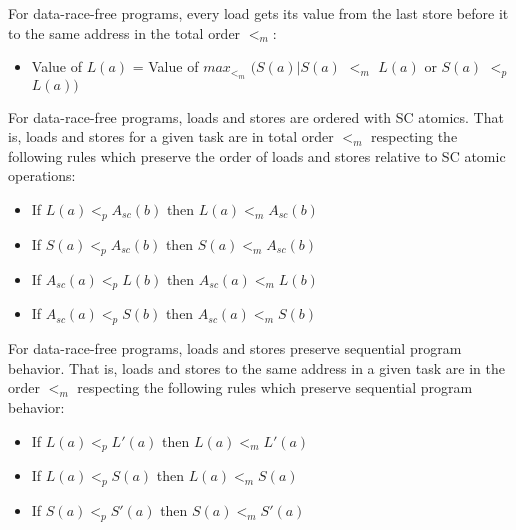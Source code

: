 For data-race-free programs, every load gets its value from the last
store before it to the same address in the total order $<_m$:
\begin{itemize}
  \item Value of $L(a)$ = Value of $max_{<_m}$ $( S(a)|S(a)$ $<_m$ $L(a)$ or $S(a)$ $<_p$ $L(a) )$
\end{itemize}

For data-race-free programs, loads and stores are ordered with SC
atomics.  That is, loads and stores for a given task are in total
order $<_m$ respecting the following rules which preserve the order of
loads and stores relative to SC atomic operations:


\begin{itemize}
  \item If $L(a)<_pA_{sc}(b)$ then $L(a)<_mA_{sc}(b)$
  \item If $S(a)<_pA_{sc}(b)$ then $S(a)<_mA_{sc}(b)$
  \item If $A_{sc}(a)<_pL(b)$ then $A_{sc}(a)<_mL(b)$
  \item If $A_{sc}(a)<_pS(b)$ then $A_{sc}(a)<_mS(b)$
\end{itemize}

For data-race-free programs, loads and stores preserve sequential
program behavior.  That is, loads and stores to the same address in a
given task are in the order $<_m$ respecting the following rules which
preserve sequential program behavior:

\begin{itemize}
  \item If $L(a) <_p L'(a)$ then $L(a) <_m L'(a)$
  \item If $L(a) <_p S(a)$ then $L(a) <_m S(a)$
  \item If $S(a) <_p S'(a)$ then $S(a) <_m S'(a)$
\end{itemize}


